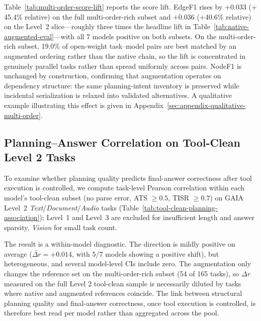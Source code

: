 \documentclass{article}
\begin{document}
Table~\ref{tab:multi-order-score-lift} reports the score lift. EdgeF1 rises by $+$0.033 ($+$45.4\% relative) on the full multi-order-rich subset and $+$0.036 ($+$40.6\% relative) on the Level~2 slice---roughly three times the headline lift in Table~\ref{tab:native-augmented-eval}---with all 7 models positive on both subsets.
On the multi-order-rich subset, 19.0\% of open-weight task--model pairs are best matched by an augmented ordering rather than the native chain, so the lift is concentrated in genuinely parallel tasks rather than spread uniformly across pairs.
NodeF1 is unchanged by construction, confirming that augmentation operates on dependency structure: the same planning-intent inventory is preserved while incidental serialization is relaxed into validated alternatives. A qualitative example illustrating this effect is given in Appendix~\ref{sec:appendix-qualitative-multi-order}.




\subsection{Planning--Answer Correlation on Tool-Clean Level 2 Tasks}
\label{sec:tool-clean-correlation}

To examine whether planning quality predicts final-answer correctness after tool execution is controlled, we compute task-level Pearson correlation within each model's tool-clean subset (no parse error, ATS $\ge 0.5$, TISR $\ge 0.7$) on GAIA Level~2 \emph{Text}/\emph{Document}/\emph{Audio} tasks (Table~\ref{tab:tool-clean-planning-association}); Level~1 and Level~3 are excluded for insufficient length and answer sparsity, \emph{Vision} for small task count.

The result is a within-model diagnostic. The direction is mildly positive on average ($\bar{\Delta r} = +0.014$, with $5/7$ models showing a positive shift), but heterogeneous, and several model-level CIs include zero. The augmentation only changes the reference set on the multi-order-rich subset (54 of 165 tasks), so $\Delta r$ measured on the full Level 2 tool-clean sample is necessarily diluted by tasks where native and augmented references coincide. The link between structural planning quality and final-answer correctness, once tool execution is controlled, is therefore best read per model rather than aggregated across the pool.
\end{document}
